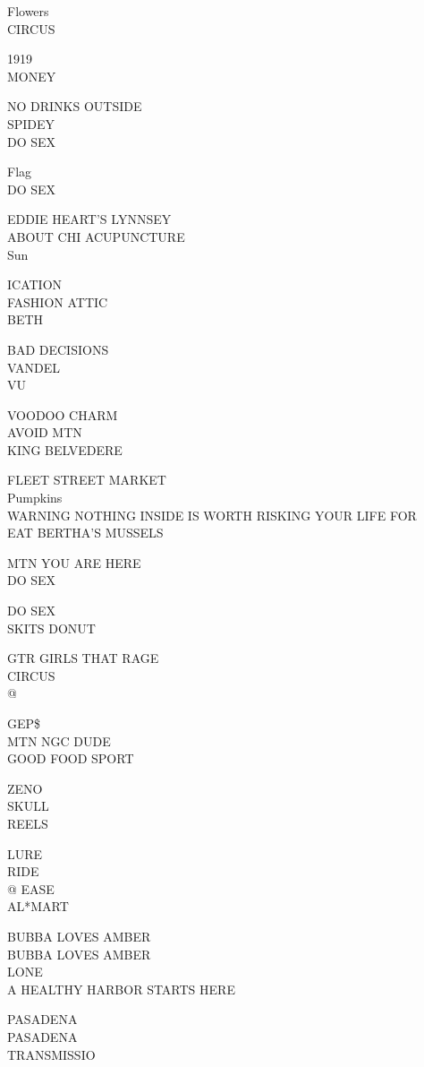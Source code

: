 \documentclass[10pt,letterpaper]{article}
\begin{document}
Flowers\\
CIRCUS

1919\\
MONEY

NO DRINKS OUTSIDE\\
SPIDEY\\
DO SEX

Flag\\
DO SEX

EDDIE HEART'S LYNNSEY\\
ABOUT CHI ACUPUNCTURE\\
Sun

ICATION\\
FASHION ATTIC\\
BETH

BAD DECISIONS\\
VANDEL\\
VU

VOODOO CHARM\\
AVOID MTN\\
KING BELVEDERE

FLEET STREET MARKET\\
Pumpkins\\
WARNING NOTHING INSIDE IS WORTH RISKING YOUR LIFE FOR\\
EAT BERTHA'S MUSSELS

MTN YOU ARE HERE\\
DO SEX

DO SEX\\
SKITS DONUT

GTR GIRLS THAT RAGE\\
CIRCUS\\
@

GEP\$\\
MTN NGC DUDE\\
GOOD FOOD SPORT

ZENO\\
SKULL\\
REELS

LURE\\
RIDE\\
@ EASE\\
AL*MART

BUBBA LOVES AMBER\\
BUBBA LOVES AMBER\\
LONE\\
A HEALTHY HARBOR STARTS HERE

PASADENA\\
PASADENA\\
TRANSMISSIO
\end{document}

